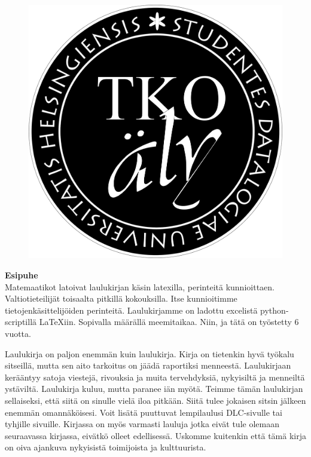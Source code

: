 \afterpage{\blankpage}
\begin{figure}[h!]
\centering
\includegraphics[scale=0.4]{graphics/logo.png}
\end{figure}

\newpage

\textbf{Esipuhe}
\\

Matemaatikot latoivat laulukirjan käsin latexilla, perinteitä kunnioittaen.
Valtiotieteilijät toisaalta pitkillä kokouksilla. Itse kunnioitimme
tietojenkäsittelijöiden perinteitä. Laulu\-kirjamme on ladottu excelistä
python-scriptillä \LaTeX{}iin. Sopivalla määrällä mee\-mi\-taikaa. Niin, ja tätä on työstetty 6 vuotta.

Laulukirja on paljon enemmän kuin laulukirja. Kirja on tieten\-kin hyvä työkalu
sitseillä, mutta sen aito tarkoitus on jäädä ra\-por\-tik\-si menneestä. Laulukirjaan
kerääntyy satoja viestejä, rivouksia ja muita tervehdyksiä, nykyisiltä ja
menneiltä ystäviltä. Laulukirja kuluu, mutta paranee iän myötä. Teimme tämän
laulukirjan sel\-lai\-sek\-si, että siitä on sinulle vielä iloa pitkään. Siitä tulee
jokaisen sitsin jälkeen enemmän omannäköisesi. Voit lisätä puuttuvat lempi\-laulusi DLC-sivulle tai tyhjille sivuille.
Kirjassa on myös varmasti lauluja jotka eivät tule olemaan seuraavassa
kirjassa, eivätkö olleet edellisessä. Uskomme kuitenkin että tämä kirja on oiva
ajankuva nykyisistä toimijoista ja kulttuurista.

